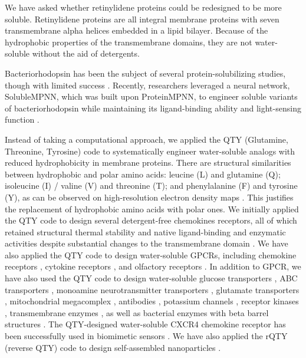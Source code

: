 \documentclass[fleqn, 10pt, lineno]{manuscript}
\begin{document}
We have asked whether retinylidene proteins could be redesigned to be more soluble. Retinylidene proteins are all integral membrane proteins with seven transmembrane alpha helices embedded in a lipid bilayer. Because of the hydrophobic properties of the transmembrane domains, they are not water-soluble without the aid of detergents. 

Bacteriorhodopsin has been the subject of several protein-solubilizing studies, though with limited success \citep{Qing_2022}. Recently, researchers leveraged a neural network, SolubleMPNN, which was built upon ProteinMPNN, to engineer soluble variants of bacteriorhodopsin while maintaining its ligand-binding ability and light-sensing function \citep{Nikolaev_2024}.

Instead of taking a computational approach, we applied the QTY (Glutamine, Threonine, Tyrosine) code to systematically engineer water-soluble analogs with reduced hydrophobicity in membrane proteins. There are structural similarities between hydrophobic and polar amino acids: leucine (L) and glutamine (Q); isoleucine (I) / valine (V) and threonine (T); and phenylalanine (F) and tyrosine (Y), as can be observed on high-resolution electron density maps \citep{Zhang_2018, Zhang_2022, Tegler_2020}. This justifies the replacement of hydrophobic amino acids with polar ones. We initially applied the QTY code to design several detergent-free chemokines receptors, all of which retained structural thermal stability and native ligand-binding and enzymatic activities despite substantial changes to the transmembrane domain \citep{Zhang_2018, Tegler_2020}. We have also applied the QTY code to design water-soluble GPCRs, including chemokine receptors \citep{Zhang_2018, Qing_2019, Tegler_2020, Skuhersky_2021}, cytokine receptors \citep{Hao_2020}, and olfactory receptors \citep{Skuhersky_2021, Johnsson_2025}. In addition to GPCR, we have also used the QTY code to design water-soluble glucose transporters \citep{Smorodina_2022}, ABC transporters \citep{Pan_2024}, monoamine neurotransmitter transporters \citep{Karagol_Karagol_Alper_2024}, glutamate transporters \citep{Karagol_Karagol_Smorodina_2024, Karagol_2024}, mitochondrial megacomplex \citep{Chen_2025}, antibodies \citep{Li_Wang_2024}, potassium channels \citep{Smorodina_2024}, receptor kinases \citep{Li_Tang_2024}, transmembrane enzymes \citep{Chen_Pan_2025}, as well as bacterial enzymes with beta barrel structures \citep{Sajeev-Sheeja_2023, Sajeev-Sheeja_2024}. The QTY-designed water-soluble CXCR4 chemokine receptor has been successfully used in biomimetic sensors \citep{Qing_2023}. We have also applied the rQTY (reverse QTY) code to design self-assembled nanoparticles \citep{Meng_2023}.
\end{document}
